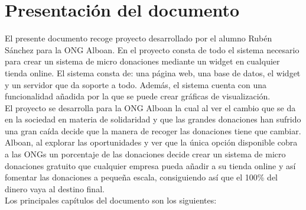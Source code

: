 \section{Presentación del documento}

El presente documento recoge proyecto desarrollado por el alumno Rubén Sánchez para la ONG Alboan. En el proyecto consta de todo el sistema necesario para crear un sistema de micro donaciones mediante un widget en cualquier tienda online. El sistema consta de: una página web, una base de datos, el widget y un servidor que da soporte a todo. Además, el sistema cuenta con una funcionalidad añadida por la que se puede crear gráficas de visualización.\\

El proyecto se desarrolla para la ONG Alboan la cual al ver el cambio que se da en la sociedad en materia de solidaridad y que las grandes donaciones han sufrido una gran caída decide que la manera de recoger las donaciones tiene que cambiar. Alboan, al explorar las oportunidades y ver que la única opción disponible cobra a las ONGs un porcentaje de las donaciones decide crear un sistema de micro donaciones gratuito que cualquier empresa pueda añadir a su tienda online y así fomentar las donaciones a pequeña escala, consiguiendo así que el 100\% del dinero vaya al destino final.\\

Los principales capítulos del documento son los siguientes:

